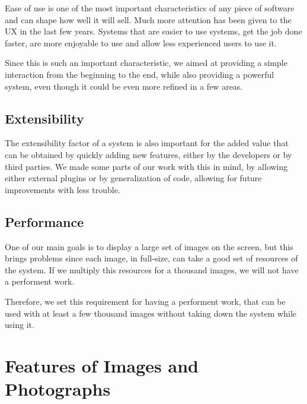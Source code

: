Ease of use is one of the most important characteristics of any piece of software and can shape how well it will sell. Much more attention has been given to the \ac{UX} in the last few years. Systems that are easier to use systems, get the job done faster, are more enjoyable to use and allow less experienced users to use it.

Since this is such an important characteristic, we aimed at providing a simple interaction from the beginning to the end, while also providing a powerful system, even though it could be even more refined in a few areas.




\subsection{Extensibility} %
\label{ssub:Extensibility}

The extensibility factor of a system is also important for the added value that can be obtained by quickly adding new features, either by the developers or by third parties. We made some parts of our work with this in mind, by allowing either external plugins or by generalization of code, allowing for future improvements with less trouble.




\subsection{Performance} %
\label{ssub:Performance}

One of our main goals is to display a large set of images on the screen, but this brings problems since each image, in full-size, can take a good set of resources of the system. If we multiply this resources for a thousand images, we will not have a performent work.

Therefore, we set this requirement for having a performent work, that can be used with at least a few thousand images without taking down the system while using it.








\section{Features of Images and Photographs}
\label{s:features}

